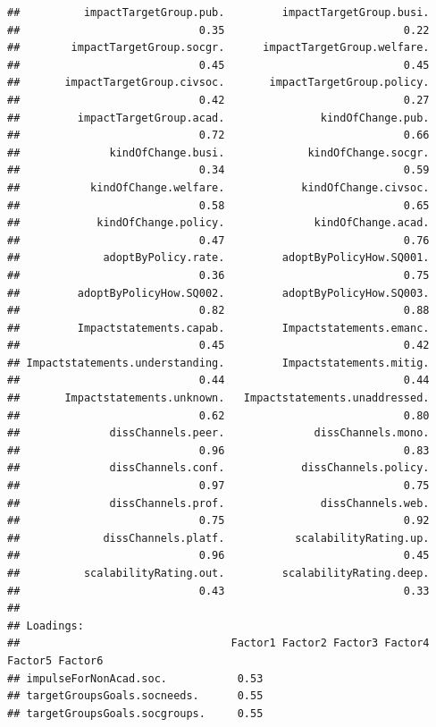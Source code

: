 \documentclass[
]{article}
\begin{document}
\begin{verbatim}
##          impactTargetGroup.pub.         impactTargetGroup.busi. 
##                            0.35                            0.22 
##        impactTargetGroup.socgr.      impactTargetGroup.welfare. 
##                            0.45                            0.45 
##       impactTargetGroup.civsoc.       impactTargetGroup.policy. 
##                            0.42                            0.27 
##         impactTargetGroup.acad.               kindOfChange.pub. 
##                            0.72                            0.66 
##              kindOfChange.busi.             kindOfChange.socgr. 
##                            0.34                            0.59 
##           kindOfChange.welfare.            kindOfChange.civsoc. 
##                            0.58                            0.65 
##            kindOfChange.policy.              kindOfChange.acad. 
##                            0.47                            0.76 
##             adoptByPolicy.rate.         adoptByPolicyHow.SQ001. 
##                            0.36                            0.75 
##         adoptByPolicyHow.SQ002.         adoptByPolicyHow.SQ003. 
##                            0.82                            0.88 
##         Impactstatements.capab.         Impactstatements.emanc. 
##                            0.45                            0.42 
## Impactstatements.understanding.         Impactstatements.mitig. 
##                            0.44                            0.44 
##       Impactstatements.unknown.   Impactstatements.unaddressed. 
##                            0.62                            0.80 
##              dissChannels.peer.              dissChannels.mono. 
##                            0.96                            0.83 
##              dissChannels.conf.            dissChannels.policy. 
##                            0.97                            0.75 
##              dissChannels.prof.               dissChannels.web. 
##                            0.75                            0.92 
##             dissChannels.platf.           scalabilityRating.up. 
##                            0.96                            0.45 
##          scalabilityRating.out.         scalabilityRating.deep. 
##                            0.43                            0.33 
## 
## Loadings:
##                                 Factor1 Factor2 Factor3 Factor4 Factor5 Factor6
## impulseForNonAcad.soc.           0.53                                          
## targetGroupsGoals.socneeds.      0.55                                          
## targetGroupsGoals.socgroups.     0.55                                          

\end{verbatim}
\end{document}
